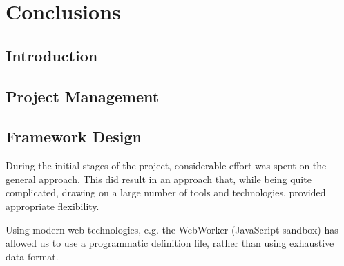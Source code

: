 \chapter{Conclusions} \label{Chapter: Conclusions}

\begin{preamble}
\end{preamble}


\section{Introduction}



\section{Project Management}



\section{Framework Design}


During the initial stages of the project, considerable effort was spent on the
general approach. This did result in an approach that, while being quite
complicated, drawing on a large number of tools and technologies, provided
appropriate flexibility.

Using modern web technologies, e.g. the WebWorker (JavaScript sandbox) has
allowed us to use a programmatic definition file, rather than using exhaustive
data format.

